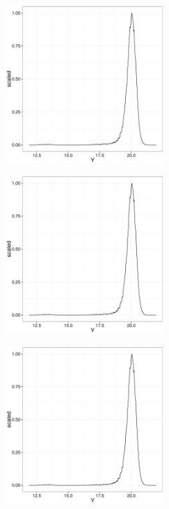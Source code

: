 \begin{figure}[ht!]
    \centering
    \begin{subfigure}[t]{0.45\textwidth}
        \includegraphics[page=1,height=6cm]{background/Figures/MissingDistribution.pdf}
        \caption{}
        \label{}
    \end{subfigure}
    \begin{subfigure}[t]{0.45\textwidth}
      \includegraphics[page=2,height=6cm]{background/Figures/MissingDistribution.pdf}
        \caption{}
        \label{} 
    \end{subfigure}
     \begin{subfigure}[t]{0.45\textwidth}
      \includegraphics[page=3,height=6cm]{background/Figures/MissingDistribution.pdf}
        \caption{}
        \label{} 
    \end{subfigure}

\end{figure}
